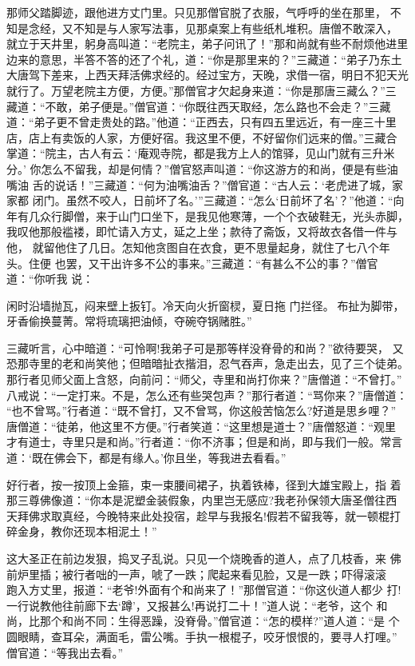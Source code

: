 那师父踏脚迹，跟他进方丈门里。只见那僧官脱了衣服，气呼呼的坐在那里，
不知是念经，又不知是与人家写法事，见那桌案上有些纸札堆积。唐僧不敢深入，
就立于天井里，躬身高叫道：“老院主，弟子问讯了！”那和尚就有些不耐烦他进里
边来的意思，半答不答的还了个礼，道：“你是那里来的？”三藏道：“弟子乃东土
大唐驾下差来，上西天拜活佛求经的。经过宝方，天晚，求借一宿，明日不犯天光
就行了。万望老院主方便，方便。”那僧官才欠起身来道：“你是那唐三藏么？”三
藏道：“不敢，弟子便是。”僧官道：“你既往西天取经，怎么路也不会走？”三藏
道：“弟子更不曾走贵处的路。”他道：“正西去，只有四五里远近，有一座三十里
店，店上有卖饭的人家，方便好宿。我这里不便，不好留你们远来的僧。”三藏合
掌道：“院主，古人有云：‘庵观寺院，都是我方上人的馆驿，见山门就有三升米分。’
你怎么不留我，却是何情？”僧官怒声叫道：“你这游方的和尚，便是有些油嘴油
舌的说话！”三藏道：“何为油嘴油舌？”僧官道：“古人云：‘老虎进了城，家家都
闭门。虽然不咬人，日前坏了名。’”三藏道：“怎么‘日前坏了名’？”他道：“向
年有几众行脚僧，来于山门口坐下，是我见他寒薄，一个个衣破鞋无，光头赤脚，
我叹他那般褴褛，即忙请入方丈，延之上坐；款待了斋饭，又将故衣各借一件与他，
就留他住了几日。怎知他贪图自在衣食，更不思量起身，就住了七八个年头。住便
也罢，又干出许多不公的事来。”三藏道：“有甚么不公的事？”僧官道：“你听我
说：

闲时沿墙抛瓦，闷来壁上扳钉。冷天向火折窗棂，夏日拖
门拦径。布扯为脚带，牙香偷换蔓菁。常将琉璃把油倾，夺碗夺锅赌胜。”

三藏听言，心中暗道：“可怜啊!我弟子可是那等样没脊骨的和尚？”欲待要哭，
又恐那寺里的老和尚笑他；但暗暗扯衣揩泪，忍气吞声，急走出去，见了三个徒弟。
那行者见师父面上含怒，向前问：“师父，寺里和尚打你来？”唐僧道：“不曾打。”
八戒说：“一定打来。不是，怎么还有些哭包声？”那行者道：“骂你来？”唐僧道：
“也不曾骂。”行者道：“既不曾打，又不曾骂，你这般苦恼怎么?好道是思乡哩？”
唐僧道：“徒弟，他这里不方便。”行者笑道：“这里想是道士？”唐僧怒道：“观里
才有道士，寺里只是和尚。”行者道：“你不济事；但是和尚，即与我们一般。常言
道：‘既在佛会下，都是有缘人。’你且坐，等我进去看看。”

好行者，按一按顶上金箍，束一束腰间裙子，执着铁棒，径到大雄宝殿上，指
着那三尊佛像道：“你本是泥塑金装假象，内里岂无感应?我老孙保领大唐圣僧往西
天拜佛求取真经，今晚特来此处投宿，趁早与我报名!假若不留我等，就一顿棍打
碎金身，教你还现本相泥土！”

这大圣正在前边发狠，捣叉子乱说。只见一个烧晚香的道人，点了几枝香，来
佛前炉里插；被行者咄的一声，唬了一跌；爬起来看见脸，又是一跌；吓得滚滚
，跑入方丈里，报道：“老爷!外面有个和尚来了！”那僧官道：“你这伙道人都少
打!一行说教他往前廊下去‘蹲’，又报甚么!再说打二十！”道人说：“老爷，这个
和尚，比那个和尚不同：生得恶躁，没脊骨。”僧官道：“怎的模样?”道人道：“是
个圆眼睛，查耳朵，满面毛，雷公嘴。手执一根棍子，咬牙恨恨的，要寻人打哩。”
僧官道：“等我出去看。”


